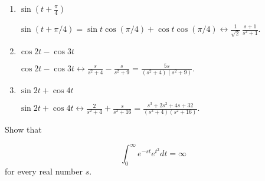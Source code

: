 \documentclass{ximera}
\begin{document}
\begin{problem}
\begin{enumerate}
    \item $\sin\left(t+\frac{\pi}{4}\right)$
        
    \begin{solution}
$\sin(t+\pi/4)=\sin
t\cos(\pi/4)+\cos
t\cos(\pi/4)\leftrightarrow\frac{1}{\sqrt{2}}\,\frac{s+1}{s^2+1}$.
    \end{solution}
    
    \item $\cos 2t -\cos 3t$
        
    \begin{solution}
$\cos 2t -\cos 3t\leftrightarrow\frac{s}{s^2+4}-\frac{s}{s^2+9}=\frac{5s}{(s^2+4)(s^2+9)}$.
    \end{solution}
    
    \item $\sin 2t +\cos 4t$
        
    \begin{solution}
$\sin 2t +\cos4t\leftrightarrow\frac{2}{s^2+4}+\frac{s}{s^2+16} =\frac{s^3+2s^2+4s+32}{(s^2+4)(s^2+16)}$.
    \end{solution}
    
\end{enumerate}
\end{problem}

\begin{problem}\label{exer:8.1.3}
    Show that

    $$
\int_0^\infty e^{-st}e^{t^2} dt=\infty
$$
for every real number $s$.
\end{problem}
\end{document}

